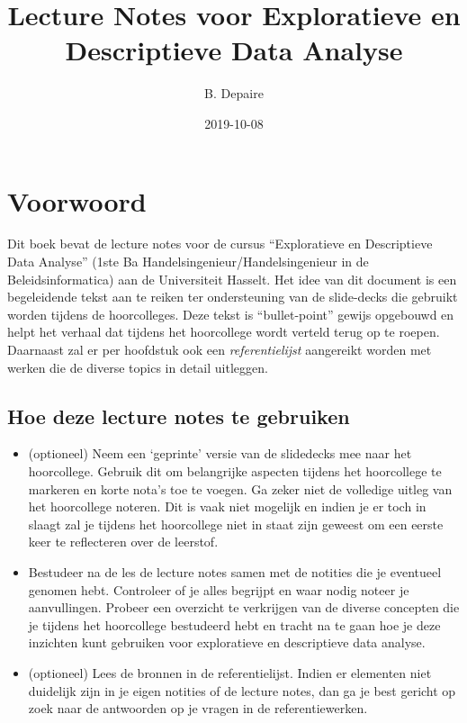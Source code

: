 \documentclass[]{memoir}
\title{Lecture Notes voor Exploratieve en Descriptieve Data Analyse}
\author{B. Depaire}
\date{2019-10-08}
\providecommand{\tightlist}{%
  \setlength{\itemsep}{0pt}\setlength{\parskip}{0pt}}
\begin{document}
\maketitle

{
\hypersetup{linkcolor=black}
\setcounter{tocdepth}{1}
\tableofcontents
}
\hypertarget{voorwoord}{%
\chapter*{Voorwoord}\label{voorwoord}}

Dit boek bevat de lecture notes voor de cursus ``Exploratieve en Descriptieve Data Analyse'' (1ste Ba Handelsingenieur/Handelsingenieur in de Beleidsinformatica) aan de Universiteit Hasselt. Het idee van dit document is een begeleidende tekst aan te reiken ter ondersteuning van de slide-decks die gebruikt worden tijdens de hoorcolleges. Deze tekst is ``bullet-point'' gewijs opgebouwd en helpt het verhaal dat tijdens het hoorcollege wordt verteld terug op te roepen. Daarnaast zal er per hoofdstuk ook een \emph{referentielijst} aangereikt worden met werken die de diverse topics in detail uitleggen.

\hypertarget{hoe-deze-lecture-notes-te-gebruiken}{%
\section*{Hoe deze lecture notes te gebruiken}\label{hoe-deze-lecture-notes-te-gebruiken}}

\begin{itemize}
\tightlist
\item
  (optioneel) Neem een `geprinte' versie van de slidedecks mee naar het hoorcollege. Gebruik dit om belangrijke aspecten tijdens het hoorcollege te markeren en korte nota's toe te voegen. Ga zeker niet de volledige uitleg van het hoorcollege noteren. Dit is vaak niet mogelijk en indien je er toch in slaagt zal je tijdens het hoorcollege niet in staat zijn geweest om een eerste keer te reflecteren over de leerstof.
\item
  Bestudeer na de les de lecture notes samen met de notities die je eventueel genomen hebt. Controleer of je alles begrijpt en waar nodig noteer je aanvullingen. Probeer een overzicht te verkrijgen van de diverse concepten die je tijdens het hoorcollege bestudeerd hebt en tracht na te gaan hoe je deze inzichten kunt gebruiken voor exploratieve en descriptieve data analyse.
\item
  (optioneel) Lees de bronnen in de referentielijst. Indien er elementen niet duidelijk zijn in je eigen notities of de lecture notes, dan ga je best gericht op zoek naar de antwoorden op je vragen in de referentiewerken.
\end{itemize}
\end{document}
